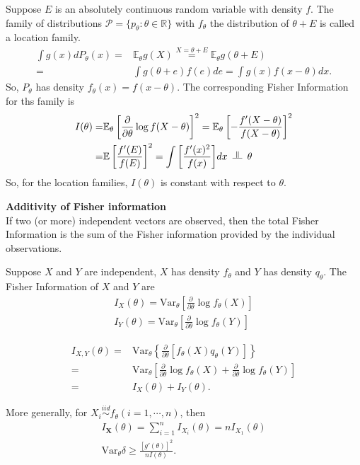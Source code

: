 \begin{example}
    Suppose $E$ is an absolutely continuous random variable with density $f$.
    The family of distributions $\mathcal{P} = \{p_\theta:\theta\in\mathbb{R}\}$ 
    with $f_\theta$ the distribution of $\theta+E$ is called a location family.
    \begin{align}
        \int{g(x)}dP_\theta(x)
        =& \mathbb{E}_\theta{g(X)} \overset{X=\theta+E}{=} \mathbb{E}_\theta{g(\theta+E)}\\
        =& \int{g(\theta+e)f(e)}de = \int{g(x)f(x-\theta)}dx.
    \end{align}
    So, $P_\theta$ has density $f_\theta(x)=f(x-\theta)$. 
    The corresponding Fisher Information for ths family is
    \begin{align}
        I(\theta)
        =& \mathbb{E}_\theta\left[ \frac{\partial}{\partial{\theta}}\log{f(X-\theta)} \right]^2
        = \mathbb{E}_\theta\left[ -\frac{f'(X-\theta)}{f(X-\theta)} \right]^2 \\
        =& \mathbb{E}\left[ \frac{f'(E)}{f(E)} \right]^2
        = \int{\left[\frac{f'(x)^2}{f(x)}\right]}dx~\vperp~\theta
    \end{align}
    So, for the location families, $I(\theta)$ is constant with respect to $\theta$.
\end{example}

\begin{example}
    \textbf{Additivity of Fisher information}\\
    If two (or more) independent vectors are observed,
    then the total Fisher Information is the sum of the Fisher information 
    provided by the individual observations.
    
    Suppose $X$ and $Y$ are independent, 
    $X$ has density $f_\theta$ and $Y$ has density $q_\theta$.
    The Fisher Information of $X$ and $Y$ are 
    \begin{gather}
        I_X(\theta)=\mathrm{Var}_\theta\left[\frac{\partial}{\partial\theta}\log{f_\theta(X)}\right]\\
        I_Y(\theta)=\mathrm{Var}_\theta\left[\frac{\partial}{\partial\theta}\log{f_\theta(Y)}\right]
    \end{gather}
    
    \begin{align}
        I_{X,Y}(\theta)
        =& \mathrm{Var}_\theta \left\{ \frac{\partial}{\partial{\theta}}[f_\theta(X)q_\theta(Y)] \right\} \\
        =& \mathrm{Var}_\theta \left[ \frac{\partial}{\partial{\theta}}\log{f_\theta(X)} + \frac{\partial}{\partial{\theta}}\log{f_\theta(Y)} \right] \\
        =& I_X(\theta) + I_Y(\theta).
    \end{align}
    
    More generally, for $X_i\overset{iid}{\sim}f_\theta (i=1,\cdots,n)$, then
    \begin{gather}
        I_{\boldsymbol{X}}(\theta) = \sum_{i=1}^n{I_{X_i}(\theta)} = nI_{X_1}(\theta) \\
        \mathrm{Var}_\theta\delta\geq\frac{[g'(\theta)]^2}{nI(\theta)}.
    \end{gather}
\end{example}

